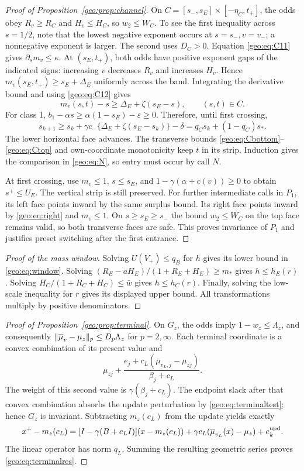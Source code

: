 \begin{proof}[Proof of Proposition~\ref{geo:prop:channel}]
On $C=[s_-,s_E]\times[-\eta_C,t_+]$, the odds obey $R_v\ge R_C$ and
$H_v\le H_C$, so $w_2\le W_C$. To see the first inequality across $s=1/2$,
note that the lowest negative exponent occurs at $s=s_-,v=v_-$; a nonnegative
exponent is larger. The second uses $D_C>0$. Equation \eqref{geo:eq:C11} gives
$\partial_s m_v\le\kappa$. At $(s_E,t_+)$, both odds have positive exponent
gaps of the indicated signs: increasing $v$ decreases $R_v$ and increases
$H_v$. Hence $m_v(s_E,t_+)\ge s_E+\Delta_E$ uniformly across the band.
Integrating the derivative bound and using \eqref{geo:eq:C12} gives
\begin{equation}\label{geo:eq:progress}
 m_v(s,t)-s\ge\Delta_E+\zeta(s_E-s),\qquad(s,t)\in C.
\end{equation}
For class 1, $b_1-\alpha s\ge\alpha(1-s_E)-\varepsilon\ge0$. Therefore, until
first crossing,
\[
 s_{k+1}\ge s_k+\gamma c_-\{\Delta_E+\zeta(s_E-s_k)\}-\delta
 =q_Cs_k+(1-q_C)s_*.
\]
The lower horizontal face advances. The transverse bounds
\eqref{geo:eq:Cbottom}--\eqref{geo:eq:Ctop} and own-coordinate monotonicity keep
$t$ in its strip. Induction gives the comparison in \eqref{geo:eq:N}, so entry
must occur by call $N$.

At first crossing, use $m_v\le1$, $s\le s_E$, and
$1-\gamma(\alpha+c(v))\ge0$ to obtain $s^+\le U_E$. The vertical strip
is still preserved. For further intermediate calls in $P_1$, its left face
points inward by the same surplus bound. Its right face points inward by
\eqref{geo:eq:right} and $m_v\le1$. On $s\ge s_E\ge s_-$ the bound $w_2\le W_C$
on the top face remains valid, so both transverse faces are safe. This proves
invariance of $P_1$ and justifies preset switching after the first entrance.
\end{proof}

\begin{proof}[Proof of the mass window]
Solving $U(V_+)\le q_B$ for $h$ gives its lower bound in
\eqref{geo:eq:window}. Solving
$(R_E-aH_E)/(1+R_E+H_E)\ge m_*$ gives $h\le h_E(r)$.
Solving $H_C/(1+R_C+H_C)\le\bar w$ gives $h\le h_C(r)$.
Finally, solving the low-scale inequality for $r$ gives its displayed upper
bound. All transformations multiply by positive denominators.
\end{proof}

\begin{proof}[Proof of Proposition~\ref{geo:prop:terminal}]
On $G_z$, the odds imply $1-w_z\le\Lambda_z$, and consequently
$\lVert\overline\mu_v-\mu_z\rVert_p\le D_p\Lambda_z$ for $p=2,\infty$.
Each terminal coordinate is a convex combination of its present value and
\[
 \mu_{zj}+\frac{e_j+c_L(\overline\mu_{v_L,j}-\mu_{zj})}
 {\beta_j+c_L}.
\]
The weight of this second value is $\gamma(\beta_j+c_L)$.
The endpoint slack after that convex combination absorbs the update
perturbation by \eqref{geo:eq:terminaltest}; hence $G_z$ is invariant.
Subtracting $m_z(c_L)$ from the update yields exactly
\[
 x^+-m_z(c_L)=[I-\gamma(B+c_LI)](x-m_z(c_L))
 +\gamma c_L(\overline\mu_{v_L}(x)-\mu_z)+e_k^{\rm upd}.
\]
The linear operator has norm $q_L$. Summing the resulting geometric series
proves \eqref{geo:eq:terminalres}.
\end{proof}

